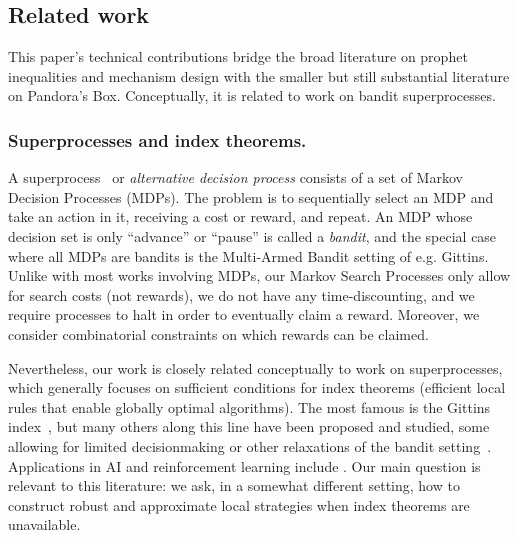 \subsection{Related work} \label{subsec:related}

This paper's technical contributions bridge the broad literature on prophet inequalities and mechanism design with the smaller but still substantial literature on Pandora's Box.
Conceptually, it is related to work on bandit superprocesses.

\subsubsection{Superprocesses and index theorems.}
A superprocess~\cite{nash1973optimal} or \emph{alternative decision process} consists of a set of Markov Decision Processes (MDPs).
The problem is to sequentially select an MDP and take an action in it, receiving a cost or reward, and repeat.
An MDP whose decision set is only ``advance'' or ``pause'' is called a \emph{bandit}, and the special case where all MDPs are bandits is the Multi-Armed Bandit setting of e.g. Gittins.
Unlike with most works involving MDPs, our Markov Search Processes only allow for search costs (not rewards), we do not have any time-discounting, and we require processes to halt in order to eventually claim a reward.
Moreover, we consider combinatorial constraints on which rewards can be claimed.

Nevertheless, our work is closely related conceptually to work on superprocesses, which generally focuses on sufficient conditions for index theorems (efficient local rules that enable globally optimal algorithms).
The most famous is the Gittins index~\citep[e.g.]{gittins1979bandit}, but many others along this line have been proposed and studied, some allowing for limited decisionmaking or other relaxations of the bandit setting~\citep{glazebrook1976profitability,whittle1980multi,nash1980generalized,glazebrook1982sufficient,granot1991optimal,glazebrook1993indices,dumitriu2003playing,keller2003branching}.
Applications in AI and reinforcement learning include \citep{brown2013optimal,hadfield-menell2015multi}.
Our main question is relevant to this literature: we ask, in a somewhat different setting, how to construct robust and approximate local strategies when index theorems are unavailable.

